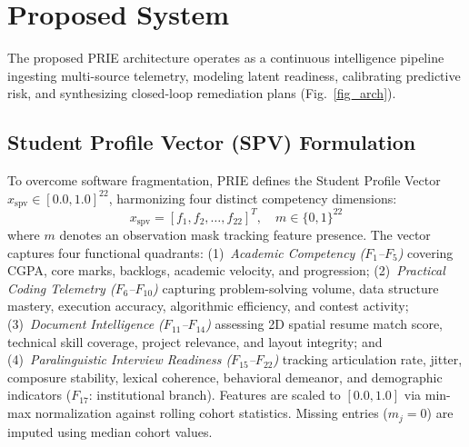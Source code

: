 \documentclass[conference]{IEEEtran}
\begin{document}
\section{Proposed System}

The proposed PRIE architecture operates as a continuous intelligence pipeline ingesting multi-source telemetry, modeling latent readiness, calibrating predictive risk, and synthesizing closed-loop remediation plans (Fig.~\ref{fig_arch}).

\subsection{Student Profile Vector (SPV) Formulation}
To overcome software fragmentation, PRIE defines the Student Profile Vector $x_{\text{spv}} \in [0.0, 1.0]^{22}$, harmonizing four distinct competency dimensions:
\begin{equation}
x_{\text{spv}} = [f_1, f_2, \dots, f_{22}]^T, \quad m \in \{0, 1\}^{22}
\end{equation}
where $m$ denotes an observation mask tracking feature presence. The vector captures four functional quadrants: (1)~\textit{Academic Competency ($F_1$--$F_5$)} covering CGPA, core marks, backlogs, academic velocity, and progression; (2)~\textit{Practical Coding Telemetry ($F_6$--$F_{10}$)} capturing problem-solving volume, data structure mastery, execution accuracy, algorithmic efficiency, and contest activity; (3)~\textit{Document Intelligence ($F_{11}$--$F_{14}$)} assessing 2D spatial resume match score, technical skill coverage, project relevance, and layout integrity; and (4)~\textit{Paralinguistic Interview Readiness ($F_{15}$--$F_{22}$)} tracking articulation rate, jitter, composure stability, lexical coherence, behavioral demeanor, and demographic indicators ($F_{17}$: institutional branch). Features are scaled to $[0.0, 1.0]$ via min-max normalization against rolling cohort statistics. Missing entries ($m_j = 0$) are imputed using median cohort values.
\end{document}
